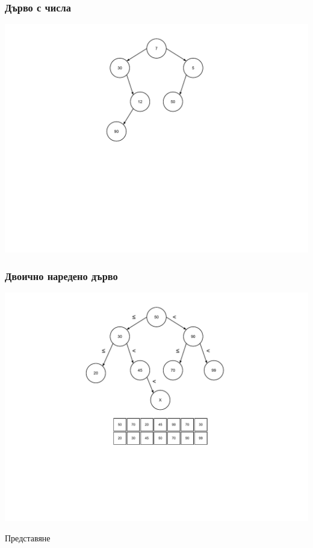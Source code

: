 \documentclass{beamer}
\begin{document}
\begin{frame}[fragile]
\frametitle{Дърво с числа}

\includegraphics[width=14cm]{images/tree_arbitrary}

\end{frame}


\begin{frame}[fragile]
\frametitle{Двоично наредено дърво}

\includegraphics[width=14cm]{images/tree_bot}

\end{frame}


\begin{frame}
\centerline{Представяне}
\end{frame}
\end{document}
